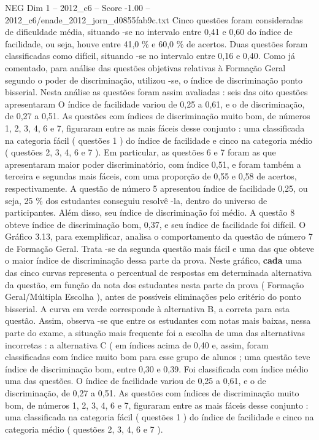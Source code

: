 \begin{textsample}{NEG Dim 1 – 2012\_c6 – Score -1.00 – 2012\_c6/enade\_2012\_jorn\_d0855fab9c.txt}
Cinco questões foram consideradas de dificuldade média, situando -se no intervalo entre 0,41 e 0,60 do índice de facilidade, ou seja, houve entre 41,0 \% e 60,0 \% de acertos.
Duas questões foram classificadas como difícil, situando -se no intervalo entre 0,16 e 0,40.
Como já comentado, para análise das questões objetivas relativas à Formação Geral segundo o poder de discriminação, utilizou -se, o índice de discriminação ponto bisserial.
Nesta análise as questões foram assim avaliadas : seis das oito questões apresentaram O índice de facilidade variou de 0,25 a 0,61, e o de discriminação, de 0,27 a 0,51.
As questões com índices de discriminação muito bom, de números 1, 2, 3, 4, 6 e 7, figuraram entre as mais fáceis desse conjunto : uma classificada na categoria fácil ( questões 1 ) do índice de facilidade e cinco na categoria médio ( questões 2, 3, 4, 6 e 7 ).
Em particular, as questões 6 e 7 foram as que apresentaram maior poder discriminatório, com índice 0,51, e foram também a terceira e segundas mais fáceis, com uma proporção de 0,55 e 0,58 de acertos, respectivamente.
A questão de número 5 apresentou índice de facilidade 0,25, ou seja, 25 \% dos estudantes conseguiu resolvê -la, dentro do universo de participantes.
Além disso, seu índice de discriminação foi médio.
A questão 8 obteve índice de discriminação bom, 0,37, e seu índice de facilidade foi difícil.
O Gráfico 3.13, para exemplificar, analisa o comportamento da questão de número 7 de Formação Geral.
Trata -se da segunda questão mais fácil e uma das que obteve o maior índice de discriminação dessa parte da prova.
Neste gráfico, \textbf{cada} uma das cinco curvas representa o percentual de respostas em determinada alternativa da questão, em função da nota dos estudantes nesta parte da prova ( Formação Geral/Múltipla Escolha ), antes de possíveis eliminações pelo critério do ponto bisserial.
A curva em verde corresponde à alternativa B, a correta para esta questão.
Assim, observa -se que entre os estudantes com notas mais baixas, nessa parte do exame, a situação mais frequente foi a escolha de uma das alternativas incorretas : a alternativa C ( em índices acima de 0,40 e, assim, foram classificadas com índice muito bom para esse grupo de alunos ; uma questão teve índice de discriminação bom, entre 0,30 e 0,39.
Foi classificada com índice médio uma das questões.
O índice de facilidade variou de 0,25 a 0,61, e o de discriminação, de 0,27 a 0,51.
As questões com índices de discriminação muito bom, de números 1, 2, 3, 4, 6 e 7, figuraram entre as mais fáceis desse conjunto : uma classificada na categoria fácil ( questões 1 ) do índice de facilidade e cinco na categoria médio ( questões 2, 3, 4, 6 e 7 ).

\end{textsample}
